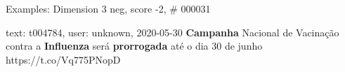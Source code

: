 \begin{frame}{Examples: Dimension 3 neg, score -2, \# 000031}
\footnotesize
\begin{alertblock}{text: t004784, user: unknown, 2020-05-30}
\textbf{Campanha} Nacional de Vacinação contra a \textbf{Influenza} será 
\textbf{prorrogada} até o dia 30 de junho https://t.co/Vq775PNopD 
\end{alertblock}
\end{frame}
